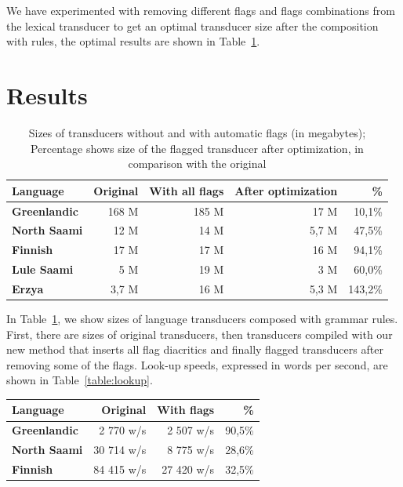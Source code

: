 \documentclass[final]{beamer}
\begin{document}
\begin{poster}
We have experimented with removing different flags and flags combinations from the lexical transducer 
to get an optimal transducer size after the composition with rules, the optimal results are shown in Table~\ref{table:sizes}. 


\section{Results}

\begin{table}[!h]
    \centering
    \begin{tabular}{|l|r|r|r|r|}
        \hline
        \bf Language & \bf Original & \bf With all flags & \bf After optimization & \bf \% \\
        \hline\hline
        \bf Greenlandic &   168 M  & 	185	M& 17 M & 10,1\%  \\
        \bf North Saami &   12 M   &  14 M	& 5,7 M & 47,5\%  \\
        \bf Finnish &   17 M     	 &	17 M 	& 16 M & 94,1\%  \\
        \bf Lule Saami  &   5 M    & 	19 M 	& 3 M & 60,0\%  \\
        \bf Erzya       &   3,7 M  &  16 M 	& 5,3 M& 143,2\%  \\
        \hline
    \end{tabular}
    \caption{Sizes of transducers without and with automatic flags (in megabytes); Percentage shows size of the flagged transducer after optimization, in comparison with the original
    \label{table:sizes}}
\end{table}

\justifying
In Table~\ref{table:sizes}, we show sizes of language transducers composed with grammar rules. First, there are sizes of original
transducers, then transducers compiled
with our new method that inserts all flag diacritics and finally flagged transducers after removing some of the flags. Look-up speeds, expressed in words per second, are shown in Table~\ref{table:lookup}.

\begin{table}[h]
 \centering
    \begin{tabular}{|l|r|r|r|}
        \hline
        \bf Language & \bf Original & \bf With flags & \bf \% \\
        \hline\hline
        \bf Greenlandic & 2 770 w/s & 2 507 w/s & 90,5\%  \\
        \bf North Saami & 30 714 w/s & 8 775 w/s & 28,6\%  \\
        \bf Finnish  & 84 415 w/s & 27 420 w/s & 32,5\%  \\


\end{tabular}
\end{table}
\end{poster}
\end{document}
